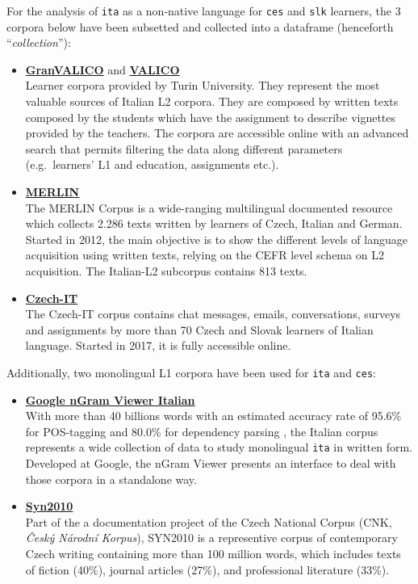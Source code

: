 \documentclass[
  a4paper,
  twoside,
  12pt,
  chapterprefix=false,
  listof=flat]{scrartcl}
\theoremstyle{plain} %
\theoremstyle{definition}
\theoremstyle{remark}
\begin{document}
For the analysis of \texttt{ita} as a non-native language for \texttt{ces} and \texttt{slk} learners, the 3 corpora below have been subsetted and collected into a dataframe (henceforth \enquote{\emph{collection}}):

\begin{itemize}
\item
  \textbf{\href{http://www.valico.org/valico_b_CORPUS.html}{GranVALICO}} and \textbf{\href{http://www.valico.org/valico_CORPUS.html}{VALICO}} \citep{valico}\\
  Learner corpora provided by Turin University. They represent the most valuable sources of Italian L2 corpora. They are composed by written texts composed by the students which have the assignment to describe vignettes provided by the teachers. The corpora are accessible online with an advanced search that permits filtering the data along different parameters (e.g.~learners' L1 and education, assignments etc.).
\item
  \textbf{\href{http://merlin-platform.eu}{MERLIN}} \citep{merlin}\\
  The MERLIN Corpus is a wide-ranging multilingual documented resource which collects 2.286 texts written by learners of Czech, Italian and German.
  Started in 2012, the main objective is to show the different levels of language acquisition using written texts, relying on the CEFR level schema on L2 acquisition.
  The Italian-L2 subcorpus contains 813 texts.
\item
  \textbf{\href{http://czech-it.github.io}{Czech-IT}} \citep{czech-it}\\
  The Czech-IT corpus contains chat messages, emails, conversations, surveys and assignments by more than 70 Czech and Slovak learners of Italian language.
  Started in 2017, it is fully accessible online.
\end{itemize}

Additionally, two monolingual L1 corpora have been used for \texttt{ita} and \texttt{ces}:

\begin{itemize}
\item
  \textbf{\href{http://books.google.com/ngrams}{Google nGram Viewer Italian}} \citep{ngram2011}\\
  With more than 40 billions words with an estimated accuracy rate of 95.6\% for POS-tagging and 80.0\% for dependency parsing \citep{ngram2012}, the Italian corpus represents a wide collection of data to study monolingual \texttt{ita} in written form. Developed at Google, the nGram Viewer presents an interface to deal with those corpora in a standalone way.
\item
  \textbf{\href{http://ucnk.korpus.cz/syn2010.php}{Syn2010}} \citep{syn2010}\\
  Part of the a documentation project of the Czech National Corpus (CNK, \emph{Český Národní Korpus}), SYN2010 is a representive corpus of contemporary Czech writing containing more than 100 million words, which includes texts of fiction (40\%), journal articles (27\%), and professional literature (33\%).
\end{itemize}
\end{document}
